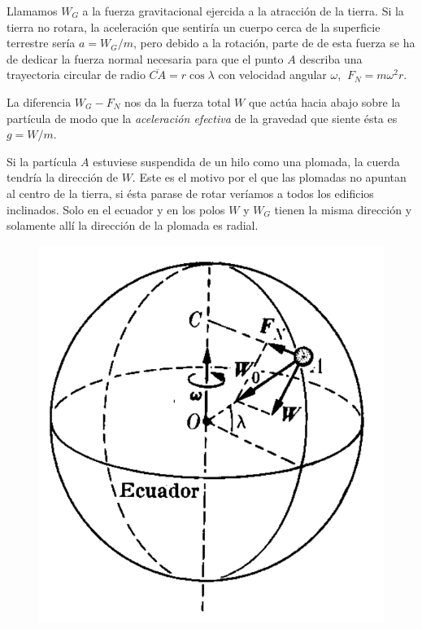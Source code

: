 Llamamos $W_G$ a la fuerza gravitacional ejercida a la atracción de la tierra. Si la tierra no rotara, la aceleración que sentiría un cuerpo cerca de la superficie terrestre sería $a=W_G/m$, pero debido a la rotación, parte de de esta fuerza se ha de dedicar la fuerza normal necesaria para que el punto $A$ describa una trayectoria circular de radio $\overline{CA}=r\cos \lambda$ con velocidad angular $\omega$, $\ F_N=m\omega^2 r$. 
\begin{multicols}{2}
La diferencia $W_G-F_N$ nos da la fuerza total $W$ que actúa hacia abajo sobre la partícula de modo que la \emph{aceleración efectiva} de la gravedad que siente ésta es $g=W/m$.

Si la partícula $A$ estuviese suspendida de un hilo como una plomada, la cuerda tendría la dirección de $W$. Este es el motivo por el que las plomadas no apuntan al centro de la tierra, si ésta parase de rotar veríamos a todos los edificios inclinados. Solo en el ecuador y en los polos $W$ y $W_G$ tienen la misma dirección y solamente allí la dirección de la plomada es radial.
\begin{figure}[H]
	\centering
	\includegraphics[width=.5\textwidth]{imagenes/imagenes03/T03IM58.png}
	\end{figure}
\end{multicols}




